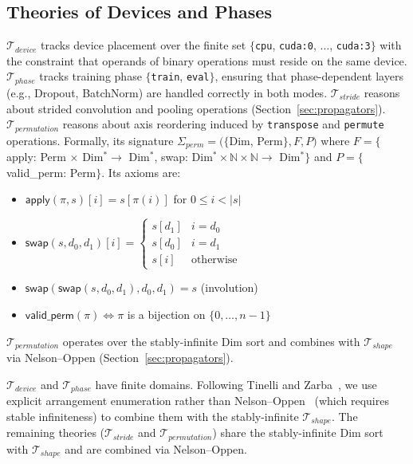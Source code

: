 \documentclass[11pt]{article}
\begin{document}
\subsection{Theories of Devices and Phases}

$\mathcal{T}_{\mathit{device}}$ tracks device placement over the
finite set $\{$\texttt{cpu}, \texttt{cuda:0}, $\ldots$,
\texttt{cuda:3}$\}$ with the constraint that operands of binary
operations must reside on the same device.
$\mathcal{T}_{\mathit{phase}}$ tracks training phase
$\{$\texttt{train}, \texttt{eval}$\}$, ensuring that
phase-dependent layers (e.g., Dropout, BatchNorm) are handled
correctly in both modes.
$\mathcal{T}_{\mathit{stride}}$ reasons about strided convolution
and pooling operations (Section~\ref{sec:propagators}).
$\mathcal{T}_{\mathit{permutation}}$ reasons about axis reordering
induced by \texttt{transpose} and \texttt{permute} operations.
Formally, its signature $\Sigma_{\mathit{perm}} = (\{$Dim, Perm$\}, F, P)$ where
$F = \{$\textsf{apply}: Perm $\times$ Dim$^* \to$ Dim$^*$,
\textsf{swap}: Dim$^* \times \mathbb{N} \times \mathbb{N} \to$ Dim$^*\}$ and
$P = \{$\textsf{valid\_perm}: Perm$\}$.  Its axioms are:
\begin{itemize}[nosep]
  \item[\textbf{P1}] $\textsf{apply}(\pi, s)[i] = s[\pi(i)]$ for $0 \le i < |s|$
  \item[\textbf{P2}] $\textsf{swap}(s, d_0, d_1)[i] = \begin{cases} s[d_1] & i = d_0 \\ s[d_0] & i = d_1 \\ s[i] & \text{otherwise}\end{cases}$
  \item[\textbf{P3}] $\textsf{swap}(\textsf{swap}(s, d_0, d_1), d_0, d_1) = s$ \hfill (involution)
  \item[\textbf{P4}] $\textsf{valid\_perm}(\pi) \iff \pi$ is a bijection on $\{0, \ldots, n{-}1\}$
\end{itemize}
$\mathcal{T}_{\mathit{permutation}}$ operates over the stably-infinite Dim sort
and combines with $\mathcal{T}_{\mathit{shape}}$ via Nelson--Oppen
(Section~\ref{sec:propagators}).

$\mathcal{T}_{\mathit{device}}$ and $\mathcal{T}_{\mathit{phase}}$
have finite domains.  Following
Tinelli and Zarba~\cite{tinelli03}, we use explicit arrangement
enumeration rather than Nelson--Oppen~\cite{nelsonoppen79}
(which requires stable infiniteness) to combine them with the
stably-infinite $\mathcal{T}_{\mathit{shape}}$.
The remaining theories ($\mathcal{T}_{\mathit{stride}}$ and
$\mathcal{T}_{\mathit{permutation}}$) share the stably-infinite
Dim sort with $\mathcal{T}_{\mathit{shape}}$ and are combined via
Nelson--Oppen.
\end{document}
